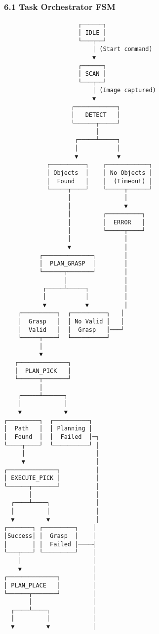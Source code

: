 \documentclass[
]{article}
\begin{document}
\hypertarget{task-orchestrator-fsm}{%
\subsubsection{6.1 Task Orchestrator FSM}\label{task-orchestrator-fsm}}

\begin{verbatim}
                     ┌──────┐
                     │ IDLE │
                     └───┬──┘
                         │ (Start command)
                         ▼
                     ┌──────┐
                     │ SCAN │
                     └───┬──┘
                         │ (Image captured)
                         ▼
                   ┌────────────┐
                   │   DETECT   │
                   └──────┬─────┘
                          │
                    ┌─────┴─────┐
                    │           │
                    ▼           ▼
            ┌──────────┐    ┌────────────┐
            │ Objects  │    │ No Objects │
            │  Found   │    │  (Timeout) │
            └─────┬────┘    └─────┬──────┘
                  │               │
                  │               ▼
                  │         ┌──────────┐
                  │         │  ERROR   │
                  │         └─────┬────┘
                  │               │
                  ▼               │
          ┌──────────────┐        │
          │  PLAN_GRASP  │        │
          └──────┬───────┘        │
                 │                │
           ┌─────┴─────┐          │
           │           │          │
           ▼           ▼          │
    ┌──────────┐  ┌──────────┐   │
    │  Grasp   │  │ No Valid │   │
    │  Valid   │  │  Grasp   │───┘
    └─────┬────┘  └──────────┘
          │
          ▼
   ┌──────────────┐
   │  PLAN_PICK   │
   └──────┬───────┘
          │
    ┌─────┴──────┐
    │            │
    ▼            ▼
┌─────────┐  ┌──────────┐
│  Path   │  │ Planning │
│  Found  │  │  Failed  │─┐
└────┬────┘  └──────────┘ │
     │                    │
     ▼                    │
┌──────────────┐          │
│ EXECUTE_PICK │          │
└──────┬───────┘          │
       │                  │
  ┌────┴────┐             │
  │         │             │
  ▼         ▼             │
┌───────┐ ┌─────────┐    │
│Success│ │  Grasp  │    │
│       │ │  Failed │────┤
└───┬───┘ └─────────┘    │
    │                    │
    ▼                    │
┌──────────────┐         │
│ PLAN_PLACE   │         │
└──────┬───────┘         │
       │                 │
  ┌────┴────┐            │
  │         │            │
  ▼         ▼            │

\end{verbatim}
\end{document}
